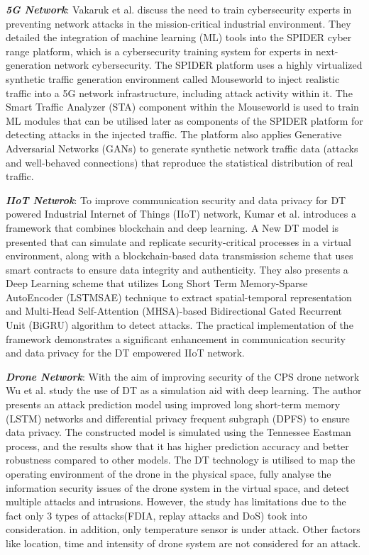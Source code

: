 \textbf{\textit{5G Network}}: Vakaruk et al.\cite{vakarukDigitalTwinNetwork2021} discuss the need to train cybersecurity experts in preventing network attacks in the mission-critical industrial environment. They detailed the integration of machine learning (ML) tools into the SPIDER cyber range platform, which is a cybersecurity training system for experts in next-generation network cybersecurity. The SPIDER platform uses a highly virtualized synthetic traffic generation environment called Mouseworld to inject realistic traffic into a 5G network infrastructure, including attack activity within it. The Smart Traffic Analyzer (STA) component within the Mouseworld is used to train ML modules that can be utilised later as components of the SPIDER platform for detecting attacks in the injected traffic. The platform also applies Generative Adversarial Networks (GANs) to generate synthetic network traffic data (attacks and well-behaved connections) that reproduce the statistical distribution of real traffic. 

\textbf{\textit{IIoT Netwrok}}: To improve communication security and data privacy for DT powered Industrial Internet of Things (IIoT) network, Kumar et al.\cite{kumarBlockchainDeepLearning2022} introduces a framework that combines blockchain and deep learning. A New DT model is presented that  can simulate and replicate security-critical processes in a virtual environment, along with a blockchain-based data transmission scheme that uses smart contracts to ensure data integrity and authenticity. They also presents a Deep Learning scheme that utilizes Long Short Term Memory-Sparse AutoEncoder (LSTMSAE) technique to extract spatial-temporal representation and Multi-Head Self-Attention (MHSA)-based Bidirectional Gated Recurrent Unit (BiGRU) algorithm to detect attacks. The practical implementation of the framework demonstrates a significant enhancement in communication security and data privacy for the DT empowered IIoT network.



\textbf{\textit{Drone Network}}: With the aim of improving security of the CPS drone network Wu et al.\cite{wuDeepLearningDriven2022} study the use of DT as a simulation aid with deep learning.  
The author presents an attack prediction model  using improved long short-term memory (LSTM) networks and differential privacy frequent subgraph (DPFS) to ensure data privacy. The constructed model is simulated using the Tennessee Eastman process, and the results show that it has higher prediction accuracy and better robustness compared to other models. The DT technology is utilised to map the operating environment of the drone in the physical space, fully analyse the information security issues of the drone system in the virtual space, and detect multiple attacks and intrusions. However, the study has limitations due to the fact only 3 types of attacks(FDIA, replay attacks and DoS) took into consideration. in addition, only temperature sensor is under attack. Other factors like location, time and intensity of drone system are not considered for an attack.  




